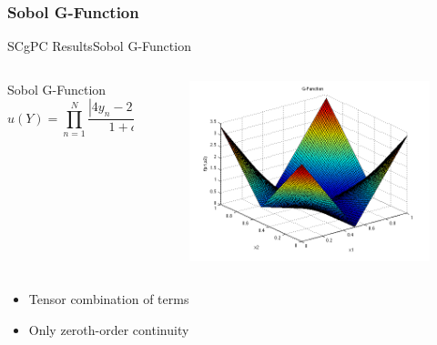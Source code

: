 \documentclass{beamer}
\begin{document}
\subsubsection{Sobol G-Function}
\begin{frame}{SCgPC Results}{Sobol G-Function}\vspace{-20pt}
  \begin{columns}
    \begin{column}{0.65\textwidth}
      \begin{block}{Sobol G-Function}
        \[u(Y) = \prod_{n=1}^N \frac{|4y_n-2|-a_n}{1+a_n},\hspace{10pt}a_n=\frac{n-2}{2}\]
      \end{block}
    \end{column}
    \begin{column}{0.35\textwidth}
        \begin{figure}[h!]
          \centering
          \includegraphics[width=\linewidth]{anlmodels/gfunc}
        \end{figure}
    \end{column}
  \end{columns}
  \begin{itemize}
    \item Tensor combination of terms
    \item Only zeroth-order continuity
  \end{itemize}
\end{frame}
\end{document}
